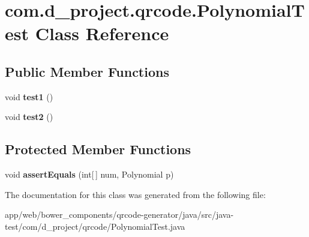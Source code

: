 \hypertarget{classcom_1_1d__project_1_1qrcode_1_1_polynomial_test}{}\section{com.\+d\+\_\+project.\+qrcode.\+Polynomial\+Test Class Reference}
\label{classcom_1_1d__project_1_1qrcode_1_1_polynomial_test}
\subsection*{Public Member Functions}
\begin{DoxyCompactItemize}
\item 
\mbox{\label{classcom_1_1d__project_1_1qrcode_1_1_polynomial_test_acc2c808e6c7b8168303e801edfea73d0}} 
void {\bfseries test1} ()
\item 
\mbox{\label{classcom_1_1d__project_1_1qrcode_1_1_polynomial_test_a12a7f15fa152c8867f851acb0b609422}} 
void {\bfseries test2} ()
\end{DoxyCompactItemize}
\subsection*{Protected Member Functions}
\begin{DoxyCompactItemize}
\item 
\mbox{\label{classcom_1_1d__project_1_1qrcode_1_1_polynomial_test_a91742e2d867b4884185bf8261380ea42}} 
void {\bfseries assert\+Equals} (int\mbox{[}$\,$\mbox{]} num, Polynomial p)
\end{DoxyCompactItemize}


The documentation for this class was generated from the following file\+:\begin{DoxyCompactItemize}
\item 
app/web/bower\+\_\+components/qrcode-\/generator/java/src/java-\/test/com/d\+\_\+project/qrcode/Polynomial\+Test.\+java\end{DoxyCompactItemize}
